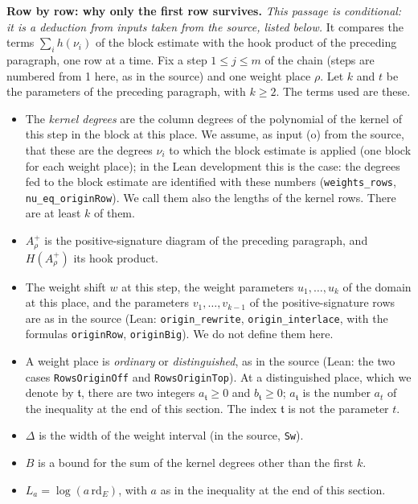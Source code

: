 \documentclass[11pt,letterpaper]{article}
\begin{document}
\textbf{Row by row: why only the first row survives.} \emph{This passage is conditional: it is a deduction
from inputs taken from the source, listed below.}
It compares the terms $\sum_ih(\nu_i)$ of the block estimate with the hook product of the preceding
paragraph, one row at a time. Fix a step $1\le j\le m$ of the chain (steps are numbered from 1 here, as in the source) and one weight place $\rho$.
Let $k$ and $t$ be the parameters of the preceding paragraph, with $k\ge2$. The terms used are these.
\begin{itemize}[leftmargin=2.4em,itemsep=1pt,topsep=3pt]
\item The \emph{kernel degrees} are the column degrees of the polynomial of the kernel of this step in the
block at this place. We assume, as input (o) from the source, that these are the degrees $\nu_i$ to which
the block estimate is applied (one block for each weight place); in the Lean development this is the case: the degrees fed to the block
estimate are identified with these numbers (\texttt{weights\_rows}, \texttt{nu\_eq\_originRow}). We call them also the lengths of the kernel rows. There are at least $k$ of them.
\item $A_\rho^+$ is the positive-signature diagram of the preceding paragraph, and $H(A_\rho^+)$ its hook
product.
\item The weight shift $w$ at this step, the weight parameters $u_1,\ldots,u_k$ of the domain at this place, and
the parameters $v_1,\ldots,v_{k-1}$ of the positive-signature rows are as in the source (Lean:
\texttt{origin\_rewrite}, \texttt{origin\_interlace}, with the formulas \texttt{originRow},
\texttt{originBig}). We do not define them here.
\item A weight place is \emph{ordinary} or \emph{distinguished}, as in the source (Lean: the two cases
\texttt{RowsOriginOff} and \texttt{RowsOriginTop}). At a distinguished place, which we denote by
$\mathfrak t$, there are two integers $a_{\mathfrak t}\ge0$ and $b_{\mathfrak t}\ge0$; $a_{\mathfrak t}$ is
the number $a_t$ of the inequality at the end of this section. The index $\mathfrak t$ is not the
parameter $t$.
\item $\Delta$ is the width of the weight interval (in the source, \texttt{Sw}).
\item $B$ is a bound for the sum of the kernel degrees other than the first $k$.
\item $L_a=\log(a\,\mathrm{rd}_E)$, with $a$ as in the inequality at the end of this section.
\end{itemize}
\end{document}
